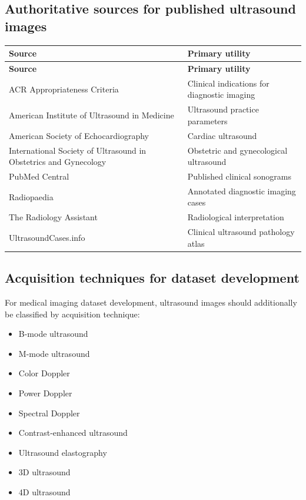 \subsection{Authoritative sources for published ultrasound images}
\begin{longtable}{@{}p{}p{}@{}}
\toprule
\textbf{Source} & \textbf{Primary utility} \\
\midrule
\endfirsthead
\toprule
\textbf{Source} & \textbf{Primary utility} \\
\midrule
\endhead
ACR Appropriateness Criteria & Clinical indications for diagnostic imaging \\
American Institute of Ultrasound in Medicine & Ultrasound practice parameters \\
American Society of Echocardiography & Cardiac ultrasound \\
International Society of Ultrasound in Obstetrics and Gynecology & Obstetric and gynecological ultrasound \\
PubMed Central & Published clinical sonograms \\
Radiopaedia & Annotated diagnostic imaging cases \\
The Radiology Assistant & Radiological interpretation \\
UltrasoundCases.info & Clinical ultrasound pathology atlas \\
\bottomrule
\end{longtable}

\subsection{Acquisition techniques for dataset development}
For medical imaging dataset development, ultrasound images should additionally be classified by acquisition technique:
\begin{itemize}
    \item B-mode ultrasound
    \item M-mode ultrasound
    \item Color Doppler
    \item Power Doppler
    \item Spectral Doppler
    \item Contrast-enhanced ultrasound
    \item Ultrasound elastography
    \item 3D ultrasound
    \item 4D ultrasound
\end{itemize}

